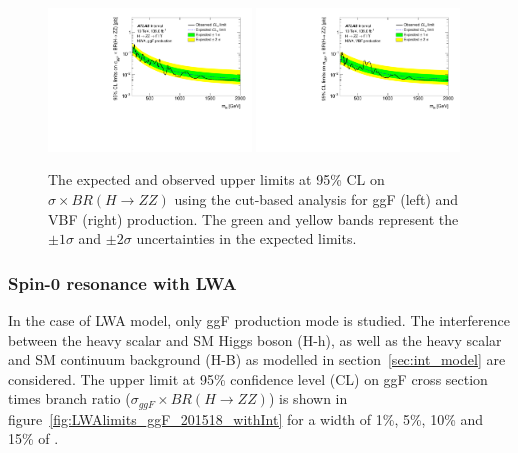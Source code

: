 \begin{figure}[h]
    \centering
    \includegraphics[width=0.48\textwidth]{figures/HMHZZ/results/4l_cut_ggF.pdf}
    \includegraphics[width=0.48\textwidth]{figures/HMHZZ/results/4l_cut_VBF.pdf}
    \caption{The expected and observed upper limits at 95\% CL on $\sigma \times BR(H \rightarrow ZZ)$ using the cut-based analysis for ggF (left) and VBF (right) production. The green and yellow bands represent the $\pm 1\sigma$ and $\pm 2\sigma$ uncertainties in the expected limits.
 }
    \label{fig:NWA201518_Cut}
\end{figure}

\subsubsection{Spin-0 resonance with LWA}

In the case of LWA model, only ggF production mode is studied.
The interference between the heavy scalar and SM Higgs boson (H-h), as well as the heavy scalar and SM \ggZZ continuum background (H-B) as modelled in section~\ref{sec:int_model} are considered.
The upper limit at 95\% confidence level (CL) on ggF cross section times branch ratio ($\sigma_{ggF} \times BR(H \rightarrow ZZ)$) is shown in figure~\ref{fig:LWAlimits_ggF_201518_withInt} for a width of 1\%, 5\%, 10\% and 15\% of \mH.

